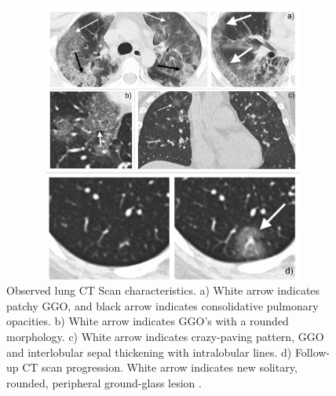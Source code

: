 \begin{figure}[H]
 \centering
 \includegraphics[width=12.5cm, height=9.2cm]{Images/CTScans2.jpg}
 \caption[CT Scan Images]{Observed lung CT Scan characteristics. a) White arrow indicates patchy GGO, and black arrow indicates consolidative pulmonary opacities. b) White arrow indicates GGO's with a rounded morphology. c)  White arrow indicates crazy-paving pattern, GGO and interlobular sepal thickening with intralobular lines. d) Follow-up CT scan progression. White arrow indicates new solitary, rounded, peripheral ground-glass lesion \cite{CMA+2020}.}
 \label{fig:CT Scan Image 1}
 \end{figure}

        

